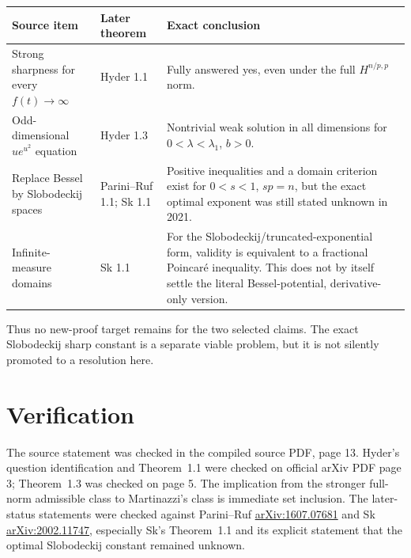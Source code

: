 \documentclass[11pt]{article}
\begin{document}
\begin{center}
\small
\begin{tabular}{>{\raggedright\arraybackslash}p{}
                >{\raggedright\arraybackslash}p{}
                >{\raggedright\arraybackslash}p{}}
\toprule
Source item & Later theorem & Exact conclusion \\
\midrule
Strong sharpness for every $f(t)\to\infty$ & Hyder 1.1 & Fully answered yes,
even under the full $H^{n/p,p}$ norm. \\
Odd-dimensional $ue^{u^2}$ equation & Hyder 1.3 & Nontrivial weak solution in
all dimensions for $0<\lambda<\lambda_1$, $b>0$. \\
Replace Bessel by Slobodeckij spaces & Parini--Ruf 1.1; Sk 1.1 & Positive
inequalities and a domain criterion exist for $0<s<1$, $sp=n$, but the exact
optimal exponent was still stated unknown in 2021. \\
Infinite-measure domains & Sk 1.1 & For the Slobodeckij/truncated-exponential
form, validity is equivalent to a fractional Poincar\'e inequality.  This does
not by itself settle the literal Bessel-potential, derivative-only version. \\
\bottomrule
\end{tabular}
\end{center}

Thus no new-proof target remains for the two selected claims.  The exact
Slobodeckij sharp constant is a separate viable problem, but it is not silently
promoted to a resolution here.

\section{Verification}

The source statement was checked in the compiled source PDF, page 13.  Hyder's
question identification and Theorem~1.1 were checked on official arXiv PDF
page 3; Theorem~1.3 was checked on page 5.  The implication from the stronger
full-norm admissible class to Martinazzi's class is immediate set inclusion.
The later-status statements were checked against Parini--Ruf
\href{https://arxiv.org/abs/1607.07681}{arXiv:1607.07681} and Sk
\href{https://arxiv.org/abs/2002.11747}{arXiv:2002.11747}, especially Sk's
Theorem~1.1 and its explicit statement that the optimal Slobodeckij constant
remained unknown.
\end{document}
